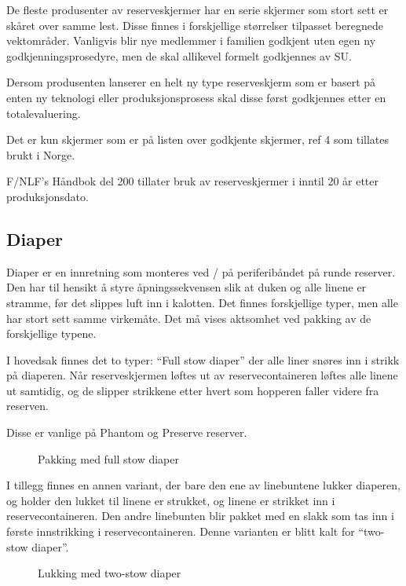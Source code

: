 De fleste produsenter av reserveskjermer har en serie skjermer som stort sett er skåret over samme lest. Disse finnes i forskjellige størrelser tilpasset beregnede vektområder. Vanligvis blir nye medlemmer i familien godkjent uten egen ny godkjenningsprosedyre, men de skal allikevel formelt godkjennes av SU.

Dersom produsenten lanserer en helt ny type reserveskjerm som er basert på enten ny teknologi eller produksjonsprosess skal disse først godkjennes etter en totalevaluering.

Det er kun skjermer som er på listen over godkjente skjermer, ref 4 som tillates brukt i Norge.

F/NLF’s Håndbok del 200 tillater bruk av reserveskjermer i inntil 20 år etter produksjonsdato.

\subsection{Diaper}
Diaper er en innretning som monteres ved / på periferibåndet på runde reserver. Den har til hensikt å styre åpningssekvensen slik at duken og alle linene er stramme, før det slippes luft inn i kalotten. Det finnes forskjellige typer, men alle har stort sett samme virkemåte. Det må vises aktsomhet ved pakking av de forskjellige typene.

I hovedsak finnes det to typer: ``Full stow diaper'' der alle liner snøres inn i strikk på diaperen. Når reserveskjermen løftes ut av reservecontaineren løftes alle linene ut samtidig, og de slipper strikkene etter hvert som hopperen faller videre fra reserven.

Disse er vanlige på Phantom og Preserve reserver.

\begin{figure}
	\caption{Pakking med full stow diaper}
\end{figure}

I tillegg finnes en annen variant, der bare den ene av linebuntene lukker diaperen, og holder den lukket til linene er strukket, og linene er strikket inn i reservecontaineren. Den andre linebunten blir pakket med en slakk som tas inn i første innstrikking i reservecontaineren. Denne varianten er blitt kalt for ``two- stow diaper''.

\begin{figure}
	\caption{Lukking med two-stow diaper}
\end{figure}

